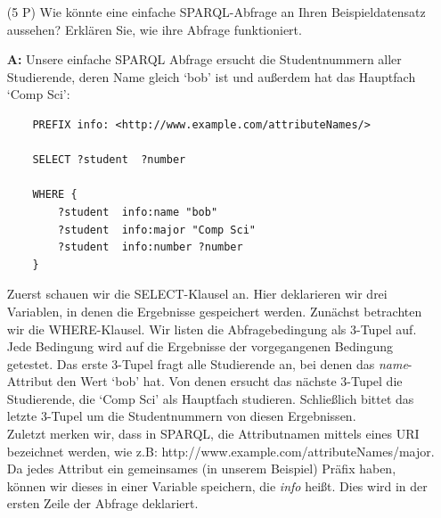 \documentclass[12pt]{report}
\newcommand{\answer}{\textbf{A:}}
\begin{document}
\begin{enumerate}
\item[(5 P)] Wie könnte eine einfache SPARQL-Abfrage an Ihren Beispieldatensatz aussehen? Erklären Sie, wie ihre Abfrage funktioniert.
\item[\answer]
  Unsere einfache SPARQL Abfrage ersucht die Studentnummern aller Studierende, deren Name gleich `bob' ist und außerdem hat das Hauptfach `Comp Sci':


  \begin{lstlisting}
    PREFIX info: <http://www.example.com/attributeNames/>

    SELECT ?student  ?number

    WHERE {
        ?student  info:name "bob"
        ?student  info:major "Comp Sci"
        ?student  info:number ?number
    }
  \end{lstlisting}

  Zuerst schauen wir die SELECT-Klausel an. Hier deklarieren wir drei Variablen, in denen die Ergebnisse gespeichert werden. Zunächst betrachten wir die WHERE-Klausel. Wir listen die Abfragebedingung als 3-Tupel auf. Jede Bedingung wird auf die Ergebnisse der vorgegangenen Bedingung getestet. Das erste 3-Tupel fragt alle Studierende an, bei denen das \textit{name}-Attribut den Wert `bob' hat. Von denen ersucht das nächste 3-Tupel die Studierende, die `Comp Sci' als Hauptfach studieren. Schließlich bittet das letzte 3-Tupel um die Studentnummern von diesen Ergebnissen.\\

  Zuletzt merken wir, dass in SPARQL, die Attributnamen mittels eines URI bezeichnet werden, wie z.B: http://www.example.com/attributeNames/major. Da jedes Attribut ein gemeinsames (in unserem Beispiel) Präfix haben, können wir dieses in einer Variable speichern, die \textit{info} heißt. Dies wird in der ersten Zeile der Abfrage deklariert.


\end{enumerate}
\end{document}
